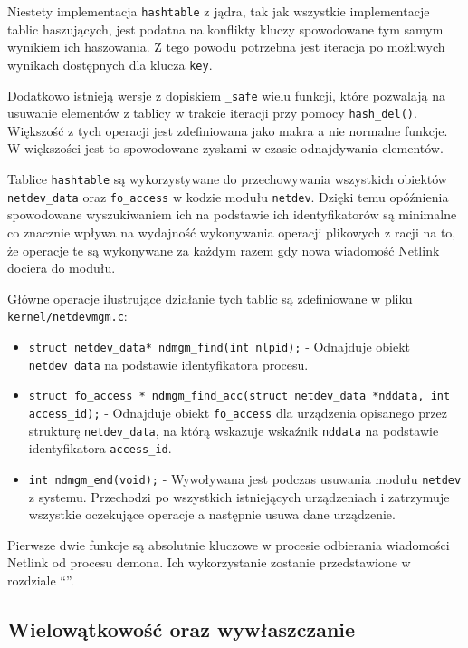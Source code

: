 \documentclass[11pt]{scrartcl}
\begin{document}
Niestety implementacja \texttt{hashtable} z jądra, tak jak wszystkie implementacje tablic haszujących, jest podatna na konflikty kluczy spowodowane tym samym wynikiem ich haszowania. Z tego powodu potrzebna jest iteracja po możliwych wynikach dostępnych dla klucza \texttt{key}.

Dodatkowo istnieją wersje z dopiskiem \texttt{\_safe} wielu funkcji, które pozwalają na usuwanie elementów z tablicy w trakcie iteracji przy pomocy \texttt{hash\_del()}. Większość z tych operacji jest zdefiniowana jako makra a nie normalne funkcje. W większości jest to spowodowane zyskami w czasie odnajdywania elementów.

Tablice \texttt{hashtable} są wykorzystywane do przechowywania wszystkich obiektów \texttt{netdev\_data} oraz \texttt{fo\_access} w kodzie modułu \texttt{netdev}. Dzięki temu opóźnienia spowodowane wyszukiwaniem ich na podstawie ich identyfikatorów są minimalne co znacznie wpływa na wydajność wykonywania operacji plikowych z racji na to, że operacje te są wykonywane za każdym razem gdy nowa wiadomość Netlink dociera do modułu.

Główne operacje ilustrujące działanie tych tablic są zdefiniowane w pliku \texttt{kernel/netdevmgm.c}:

\begin{itemize}
\itemsep1pt\parskip0pt
\item
  \texttt{struct netdev\_data* ndmgm\_find(int nlpid);} - Odnajduje obiekt \texttt{netdev\_data} na podstawie identyfikatora procesu.
\item
  \texttt{struct fo\_access * ndmgm\_find\_acc(struct netdev\_data *nddata, int access\_id);} - Odnajduje obiekt \texttt{fo\_access} dla urządzenia opisanego przez strukturę \texttt{netdev\_data}, na którą wskazuje wskaźnik \texttt{nddata} na podstawie identyfikatora \texttt{access\_id}.
\item
  \texttt{int ndmgm\_end(void);} - Wywoływana jest podczas usuwania modułu \texttt{netdev} z systemu. Przechodzi po wszystkich istniejących urządzeniach i zatrzymuje wszystkie oczekujące operacje a następnie usuwa dane urządzenie.
\end{itemize}

Pierwsze dwie funkcje są absolutnie kluczowe w procesie odbierania wiadomości Netlink od procesu demona. Ich wykorzystanie zostanie przedstawione w rozdziale ``''.

\subsection{Wielowątkowość oraz wywłaszczanie}
\end{document}
